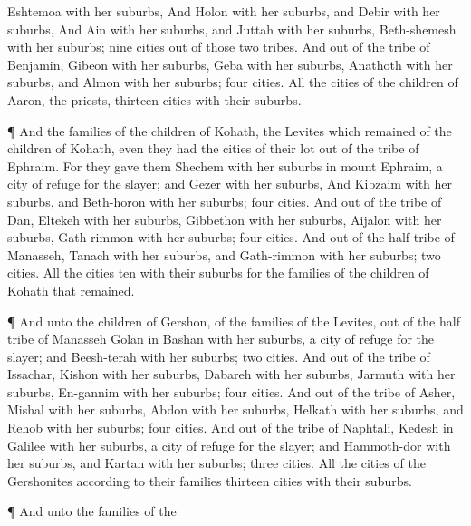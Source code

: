 {Eshtemoa with her
suburbs,
And
Holon with her
suburbs, and
Debir with her
suburbs,
And
Ain with her
suburbs, and
Juttah with her
suburbs,
{}
Beth-shemesh with her
suburbs;
nine
cities out of those
two
tribes.
And out of the
tribe of
Benjamin,
Gibeon with her
suburbs,
Geba with her
suburbs,
Anathoth with her
suburbs, and
Almon with her
suburbs;
four
cities.
All the
cities of the
children of
Aaron, the
priests,
{}
thirteen
cities with their
suburbs.
\par }{\PP {}¶ And the
families of the
children of
Kohath, the
Levites which
remained of the
children of
Kohath, even they had the
cities of their
lot out of the
tribe of
Ephraim.
For they
gave them
Shechem with her
suburbs in
mount
Ephraim,
{} a
city of
refuge for the
slayer; and
Gezer with her
suburbs,
And
Kibzaim with her
suburbs, and
Beth-horon with her
suburbs;
four
cities.
And out of the
tribe of
Dan,
Eltekeh with her
suburbs,
Gibbethon with her
suburbs,
Aijalon with her
suburbs,
Gath-rimmon with her
suburbs;
four
cities.
And out of the
half
tribe of
Manasseh,
Tanach with her
suburbs, and
Gath-rimmon with her
suburbs;
two
cities.
All the
cities
{}
ten with their
suburbs for the
families of the
children of
Kohath that
remained.
\par }{\PP {}¶ And unto the
children of
Gershon, of the
families of the
Levites, out of the
{}
half
tribe of
Manasseh
{}
Golan in
Bashan with her
suburbs,
{} a
city of
refuge for the
slayer; and
Beesh-terah with her
suburbs;
two
cities.
And out of the
tribe of
Issachar,
Kishon with her
suburbs,
Dabareh with her
suburbs,
Jarmuth with her
suburbs,
En-gannim with her
suburbs;
four
cities.
And out of the
tribe of
Asher,
Mishal with her
suburbs,
Abdon with her
suburbs,
Helkath with her
suburbs, and
Rehob with her
suburbs;
four
cities.
And out of the
tribe of
Naphtali,
Kedesh in
Galilee with her
suburbs,
{} a
city of
refuge for the
slayer; and
Hammoth-dor with her
suburbs, and
Kartan with her
suburbs;
three
cities.
All the
cities of the
Gershonites according to their
families
{}
thirteen
cities with their
suburbs.
\par }{\PP {}¶ And unto the
families of the
}
